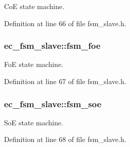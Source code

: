 \-Co\-E state machine. 



\-Definition at line 66 of file fsm\-\_\-slave.\-h.

\subsubsection[{fsm\-\_\-foe}]{ {\bf ec\-\_\-fsm\-\_\-slave\-::fsm\-\_\-foe}}\label{structec__fsm__slave_ac4d096c83edc90e10998d0581ac2b90e}


\-Fo\-E state machine. 



\-Definition at line 67 of file fsm\-\_\-slave.\-h.

\subsubsection[{fsm\-\_\-soe}]{ {\bf ec\-\_\-fsm\-\_\-slave\-::fsm\-\_\-soe}}\label{structec__fsm__slave_a631509da2c5d1a4ac23eecf89afea74e}


\-So\-E state machine. 



\-Definition at line 68 of file fsm\-\_\-slave.\-h.

